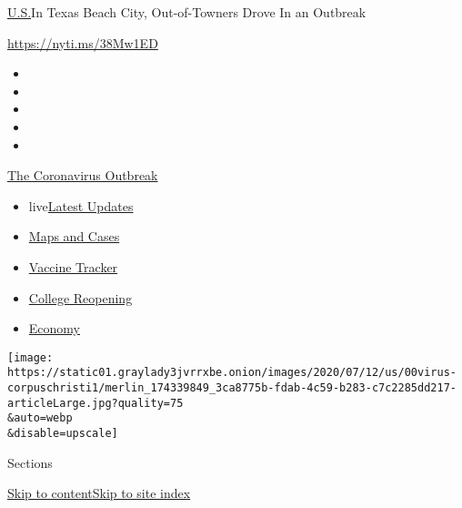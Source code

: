 \href{/section/us}{U.S.}\textbar{}In Texas Beach City, Out-of-Towners
Drove In an Outbreak

\url{https://nyti.ms/38Mw1ED}

\begin{itemize}
\item
\item
\item
\item
\item
\end{itemize}

\href{https://www.nytimes3xbfgragh.onion/news-event/coronavirus?action=click\&pgtype=Article\&state=default\&region=TOP_BANNER\&context=storylines_menu}{The
Coronavirus Outbreak}

\begin{itemize}
\tightlist
\item
  live\href{https://www.nytimes3xbfgragh.onion/2020/08/04/world/coronavirus-covid-19.html?action=click\&pgtype=Article\&state=default\&region=TOP_BANNER\&context=storylines_menu}{Latest
  Updates}
\item
  \href{https://www.nytimes3xbfgragh.onion/interactive/2020/us/coronavirus-us-cases.html?action=click\&pgtype=Article\&state=default\&region=TOP_BANNER\&context=storylines_menu}{Maps
  and Cases}
\item
  \href{https://www.nytimes3xbfgragh.onion/interactive/2020/science/coronavirus-vaccine-tracker.html?action=click\&pgtype=Article\&state=default\&region=TOP_BANNER\&context=storylines_menu}{Vaccine
  Tracker}
\item
  \href{https://www.nytimes3xbfgragh.onion/2020/08/02/us/covid-college-reopening.html?action=click\&pgtype=Article\&state=default\&region=TOP_BANNER\&context=storylines_menu}{College
  Reopening}
\item
  \href{https://www.nytimes3xbfgragh.onion/live/2020/08/03/business/stock-market-today-coronavirus?action=click\&pgtype=Article\&state=default\&region=TOP_BANNER\&context=storylines_menu}{Economy}
\end{itemize}

\texttt{[image: https://static01.graylady3jvrrxbe.onion/images/2020/07/12/us/00virus-corpuschristi1/merlin\_174339849\_3ca8775b-fdab-4c59-b283-c7c2285dd217-articleLarge.jpg?quality=75\\\&auto=webp\\\&disable=upscale]}

Sections

\protect\hyperlink{site-content}{Skip to
content}\protect\hyperlink{site-index}{Skip to site index}

